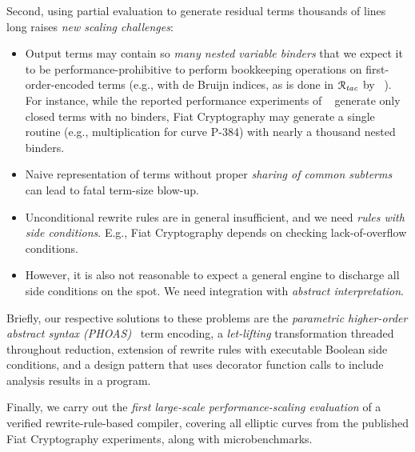 \documentclass[a4paper,USenglish,cleveref,autoref,thm-restate]{lipics-v2021}
\newcommand{\citet}[1]{\usebibentry{#1}{citet}~\cite{#1}}
\newcommand{\todo}[1]{\textcolor{red}{\textbf{TODO: #1}}}
\newcommand{\Rtac}{\ensuremath{\mathcal{R}_\text{\emph{tac}}}}
\begin{document}
Second, using partial evaluation to generate residual terms thousands of lines long raises \emph{new scaling challenges}:
\begin{itemize}
\item
  Output terms may contain so \emph{many nested variable binders} that we expect it to be performance-prohibitive to perform bookkeeping operations on first-order-encoded terms (e.g., with de Bruijn indices, as is done in \Rtac{} by \citet{rtac}).
  For instance, while the reported performance experiments of \citet{Aehlig} generate only closed terms with no binders, Fiat Cryptography may generate a single routine (e.g., multiplication for curve P-384) with nearly a thousand nested binders.
\item
  Naive representation of terms without proper \emph{sharing of common subterms} can lead to fatal term-size blow-up.
\item
  Unconditional rewrite rules are in general insufficient, and we need \emph{rules with side conditions}.
  E.g., Fiat Cryptography depends on checking lack-of-overflow conditions.
\item
  However, it is also not reasonable to expect a general engine to discharge all side conditions on the spot.
  We need integration with \emph{abstract interpretation}.
\end{itemize}

Briefly, our respective solutions to these problems are the \emph{parametric higher-order abstract syntax (PHOAS)}~\cite{PhoasICFP08} term encoding, a \emph{let-lifting} transformation threaded throughout reduction, extension of rewrite rules with executable Boolean side conditions, and a design pattern that uses decorator function calls to include analysis results in a program.

Finally, we carry out the \emph{first large-scale performance-scaling evaluation} of a verified rewrite-rule-based compiler, covering all elliptic curves from the published Fiat Cryptography experiments, along with microbenchmarks.
\end{document}
